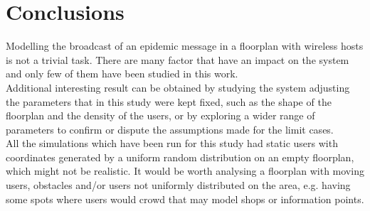 %
\chapter{Conclusions}\label{ch:conclusions}

Modelling the broadcast of an epidemic message in a floorplan with wireless hosts is not a trivial task. There are many factor that have an impact on the system and only few of them have been studied in this work.\\
Additional interesting result can be obtained by studying the system adjusting the parameters that in this study were kept fixed, such as the shape of the floorplan and the density of the users, or by exploring a wider range of parameters to confirm or dispute the assumptions made for the limit cases.\\
All the simulations which have been run for this study had static users with coordinates generated by a uniform random distribution on an empty floorplan, which might not be realistic. It would be worth analysing a floorplan with moving users, obstacles and/or users not uniformly distributed on the area, e.g. having some spots where users would crowd that may model shops or information points.
